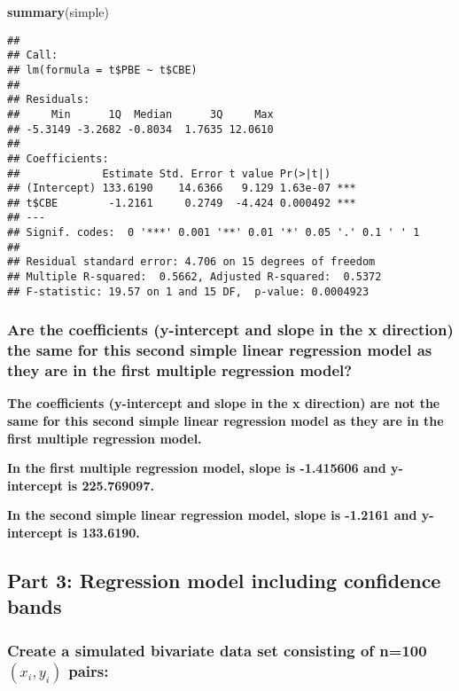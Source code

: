 \documentclass[]{article}
\newenvironment{Shaded}{\begin{snugshade}}{\end{snugshade}}
\newcommand{\KeywordTok}[1]{\textcolor[rgb]{0.13,0.29,0.53}{\textbf{#1}}}
\newcommand{\NormalTok}[1]{#1}
\begin{document}
\begin{Shaded}
\begin{Highlighting}[]
\KeywordTok{summary}\NormalTok{(simple)}
\end{Highlighting}
\end{Shaded}

\begin{verbatim}
## 
## Call:
## lm(formula = t$PBE ~ t$CBE)
## 
## Residuals:
##     Min      1Q  Median      3Q     Max 
## -5.3149 -3.2682 -0.8034  1.7635 12.0610 
## 
## Coefficients:
##             Estimate Std. Error t value Pr(>|t|)    
## (Intercept) 133.6190    14.6366   9.129 1.63e-07 ***
## t$CBE        -1.2161     0.2749  -4.424 0.000492 ***
## ---
## Signif. codes:  0 '***' 0.001 '**' 0.01 '*' 0.05 '.' 0.1 ' ' 1
## 
## Residual standard error: 4.706 on 15 degrees of freedom
## Multiple R-squared:  0.5662, Adjusted R-squared:  0.5372 
## F-statistic: 19.57 on 1 and 15 DF,  p-value: 0.0004923
\end{verbatim}

\subsubsection{Are the coefficients (y-intercept and slope in the x
direction) the same for this second simple linear regression model as
they are in the first multiple regression
model?}\label{are-the-coefficients-y-intercept-and-slope-in-the-x-direction-the-same-for-this-second-simple-linear-regression-model-as-they-are-in-the-first-multiple-regression-model}

\textbf{The coefficients (y-intercept and slope in the x direction) are
not the same for this second simple linear regression model as they are
in the first multiple regression model.}

\textbf{In the first multiple regression model, slope is -1.415606 and
y-intercept is 225.769097.}

\textbf{In the second simple linear regression model, slope is -1.2161
and y-intercept is 133.6190.}

\subsection{Part 3: Regression model including confidence
bands}\label{part-3-regression-model-including-confidence-bands}

\subsubsection{\texorpdfstring{Create a simulated bivariate data set
consisting of n=100 \((x_i, y_i)\)
pairs:}{Create a simulated bivariate data set consisting of n=100 (x\_i, y\_i) pairs:}}\label{create-a-simulated-bivariate-data-set-consisting-of-n100-x_i-y_i-pairs}
\end{document}
